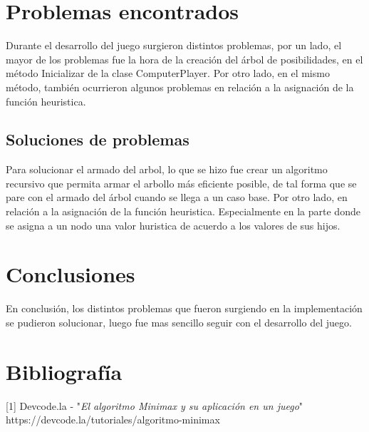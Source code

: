 \documentclass[12pt,a4paper]{article}
\begin{document}
\section{Problemas encontrados}
Durante el desarrollo del juego surgieron distintos problemas, por un lado, el mayor de los problemas fue la hora de la creación del árbol de posibilidades, en el método Inicializar de la clase ComputerPlayer. Por otro lado, en el mismo método, también ocurrieron algunos problemas en relación a la asignación de la función heuristica. 

\subsection{Soluciones de problemas}
Para solucionar el armado del arbol, lo que se hizo fue crear un algoritmo recursivo que permita armar el arbollo más eficiente posible, de tal forma que se pare con el armado del árbol cuando se llega a un caso base.
Por otro lado, en relación a la asignación de la función heuristica. Especialmente en la parte donde se asigna a un nodo una valor huristica de acuerdo a los valores de sus hijos.

\section{Conclusiones}
En conclusión, los distintos problemas que fueron surgiendo en la implementación se pudieron solucionar, luego fue mas sencillo seguir con el desarrollo del juego.
\section{Bibliografía}
[1] Devcode.la - "\emph{El algoritmo Minimax y su aplicación en un juego}"\\
https://devcode.la/tutoriales/algoritmo-minimax
\end{document}
